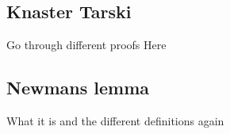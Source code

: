 \documentclass{scrartcl}
\begin{document}
\subsection{Knaster Tarski}
Go through different proofs Here

\subsection{Newmans lemma}
What it is and the different definitions again

\subsection{}
\end{document}
